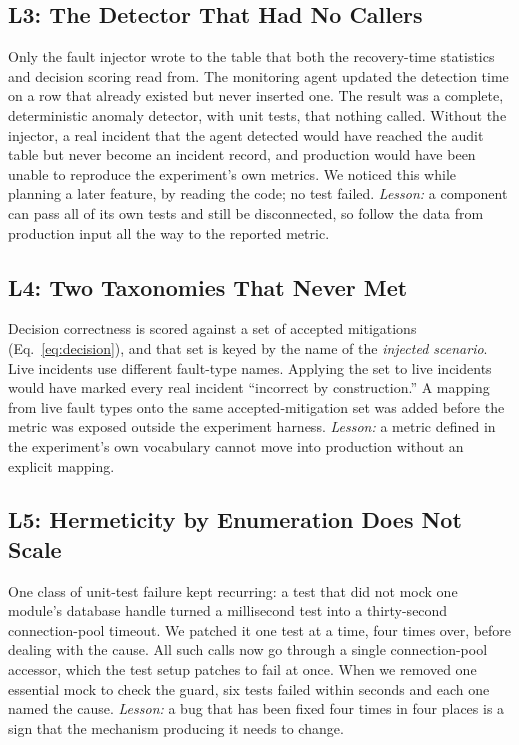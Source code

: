\subsection{L3: The Detector That Had No Callers}\label{sec:l3}
Only the fault injector wrote to the table that both the recovery-time statistics and decision
scoring read from. The monitoring agent updated the detection time on a row that already existed but
never inserted one. The result was a complete, deterministic anomaly detector, with unit tests, that
nothing called. Without the injector, a real incident that the agent detected would have reached the
audit table but never become an incident record, and production would have been unable to reproduce
the experiment's own metrics. We noticed this while planning a later feature, by reading the code; no
test failed. \emph{Lesson:} a component can pass all of its own tests and still be disconnected, so
follow the data from production input all the way to the reported metric.

\subsection{L4: Two Taxonomies That Never Met}\label{sec:l4}
Decision correctness is scored against a set of accepted mitigations (Eq.~\eqref{eq:decision}), and
that set is keyed by the name of the \emph{injected scenario}. Live incidents use different fault-type
names.
Applying the set to live incidents would have marked every real incident ``incorrect by
construction.'' A mapping from live fault types onto the same accepted-mitigation set was added
before the metric was exposed outside the experiment harness. \emph{Lesson:} a metric defined in the
experiment's own vocabulary cannot move into production without an explicit mapping.

\subsection{L5: Hermeticity by Enumeration Does Not Scale}\label{sec:l5}
One class of unit-test failure kept recurring: a test that did not mock one module's database handle
turned a millisecond test into a thirty-second connection-pool timeout. We patched it one test at a
time, four times over, before dealing with the cause. All such calls
now go through a single connection-pool accessor, which the test setup patches to fail at once. When
we removed one essential mock to check the guard, six tests failed within seconds and each one named
the cause. \emph{Lesson:} a bug that has been fixed four times in four places is a sign that the
mechanism producing it needs to change.

